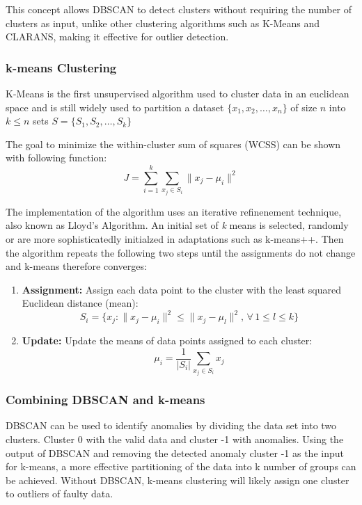 \documentclass[a4paper,12pt,twoside]{scrreprt}
\begin{document}
This concept allows DBSCAN to detect clusters without
requiring the number of clusters as input, unlike other clustering algorithms
such as K-Means and CLARANS, making it effective for outlier detection.
\cite{ester_density-based_nodate}

\subsubsection{k-means Clustering}
K-Means is the first unsupervised algorithm used to cluster data in an
euclidean space and is still widely used to partition a dataset
$ \{x_1, x_2, \dots, x_n\}$ of size
$n$ into $k \leq n$ sets $S = \{S_1, S_2, \dots, S_k\}$ \cite{sinaga_pdf_2024}

The goal to minimize the within-cluster sum of squares (WCSS) can be shown with
following function:
\[
  J = \sum_{i=1}^{k} \sum_{x_j \in S_i} \| x_j - \mu_i \|^2
\]

The implementation of the algorithm uses an iterative refinenement technique,
also known as Lloyd's Algorithm.
An initial set of \textit{k} means is selected, randomly or are more
sophisticatedly initialzed in adaptations such as k-means++.
Then the algorithm repeats the following two steps until the assignments do not
change and k-means therefore converges:

\begin{enumerate}
  \item \textbf{Assignment:} Assign each data point to the cluster with the
        least squared Euclidean distance (mean):
        \[
          S_i = \{x_j : \| x_j - \mu_i \|^2 \leq \| x_j - \mu_l \|^2, \,
          \forall \, 1
          \leq l \leq k\}
        \]
  \item \textbf{Update:} Update the means of data points assigned to each
        cluster:
        \[
          \mu_i = \frac{1}{|S_i|} \sum_{x_j \in S_i} x_j
        \]
\end{enumerate}

\subsubsection{Combining DBSCAN and k-means}
DBSCAN can be used to identify anomalies by dividing the data set into two
clusters. Cluster 0 with the valid data and cluster -1 with anomalies. Using
the output of DBSCAN and removing the detected anomaly cluster -1 as the input
for k-means, a more effective partitioning of the data into k number of groups
can be achieved.
Without DBSCAN, k-means clustering will likely assign one cluster to outliers
of faulty data.
\end{document}
